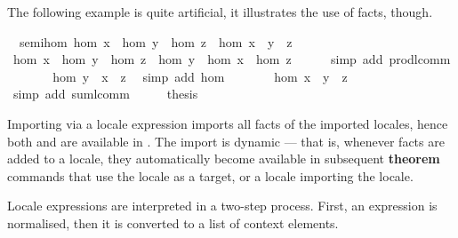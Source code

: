 \begin{isabellebody}
\begin{isamarkuptext}
  The following example is quite artificial, it illustrates the use of
  facts, though.%
\end{isamarkuptext}%
\isamarkupfalse%
\ {\isacharparenleft}\ semi{\isacharunderscore}hom{\isacharparenright}\ {\isachardoublequote}hom\ x\ {\isasymcdot}\ {\isacharparenleft}hom\ y\ {\isasymcdot}\ hom\ z{\isacharparenright}\ {\isacharequal}\ hom\ {\isacharparenleft}x\ {\isasymoplus}\ {\isacharparenleft}y\ {\isasymoplus}\ z{\isacharparenright}{\isacharparenright}{\isachardoublequote}\isanewline
%
\isadelimproof
%
\endisadelimproof
%
\isatagproof
\isamarkupfalse%
\ {\isacharminus}\isanewline
\ \ \isamarkupfalse%
\ {\isachardoublequote}hom\ x\ {\isasymcdot}\ {\isacharparenleft}hom\ y\ {\isasymcdot}\ hom\ z{\isacharparenright}\ {\isacharequal}\ hom\ y\ {\isasymcdot}\ {\isacharparenleft}hom\ x\ {\isasymcdot}\ hom\ z{\isacharparenright}{\isachardoublequote}\isanewline
\ \ \ \ \isamarkupfalse%
\ {\isacharparenleft}simp\ add{\isacharcolon}\ prod{\isachardot}lcomm{\isacharparenright}\isanewline
\ \ \isamarkupfalse%
\ \isamarkupfalse%
\ {\isachardoublequote}{\isasymdots}\ {\isacharequal}\ hom\ {\isacharparenleft}y\ {\isasymoplus}\ {\isacharparenleft}x\ {\isasymoplus}\ z{\isacharparenright}{\isacharparenright}{\isachardoublequote}\ \isamarkupfalse%
\ {\isacharparenleft}simp\ add{\isacharcolon}\ hom{\isacharparenright}\isanewline
\ \ \isamarkupfalse%
\ \isamarkupfalse%
\ {\isachardoublequote}{\isasymdots}\ {\isacharequal}\ hom\ {\isacharparenleft}x\ {\isasymoplus}\ {\isacharparenleft}y\ {\isasymoplus}\ z{\isacharparenright}{\isacharparenright}{\isachardoublequote}\ \isamarkupfalse%
\ {\isacharparenleft}simp\ add{\isacharcolon}\ sum{\isachardot}lcomm{\isacharparenright}\isanewline
\ \ \isamarkupfalse%
\ \isamarkupfalse%
\ {\isacharquery}thesis\ \isamarkupfalse%
\isacommand{{\isachardot}}\isanewline
\isamarkupfalse%
%
\endisatagproof
{\isafoldproof}%
%
\isadelimproof
%
\endisadelimproof
\isamarkuptrue%
%
\begin{isamarkuptext}%
Importing via a locale expression imports all facts of
  the imported locales, hence both  and  are
  available in .  The import is dynamic --- that is,
  whenever facts are added to a locale, they automatically
  become available in subsequent \textbf{theorem} commands that use
  the locale as a target, or a locale importing the locale.%
\end{isamarkuptext}%
\isamarkuptrue%
%
%
\label{sec-normal-forms}
\newcommand{\I}{\mathcal{I}}
\newcommand{\F}{\mathcal{F}}
\newcommand{\N}{\mathcal{N}}
\newcommand{\C}{\mathcal{C}}
\newcommand{\App}{\mathbin{\overline{@}}}
\isamarkuptrue%
%
\begin{isamarkuptext}%
Locale expressions are interpreted in a two-step process.  First, an
  expression is normalised, then it is converted to a list of context
  elements.


\end{isamarkuptext}
\end{isabellebody}
